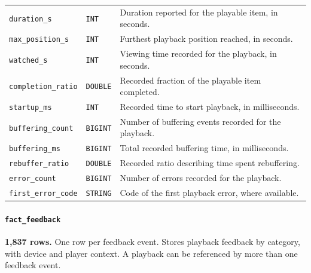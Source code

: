 \documentclass[a4paper,12pt]{article}
\newcommand{\dbsep}{\_\allowbreak}
\begin{document}
\begin{longtable}{@{}>{\raggedright\arraybackslash}p{}
                    >{\raggedright\arraybackslash}p{}
                    >{\raggedright\arraybackslash}p{}@{}}
\texttt{duration\dbsep s} & \texttt{INT} & Duration reported for the playable item, in seconds.\\
\texttt{max\dbsep position\dbsep s} & \texttt{INT} & Furthest playback position reached, in seconds.\\
\texttt{watched\dbsep s} & \texttt{INT} & Viewing time recorded for the playback, in seconds.\\
\texttt{completion\dbsep ratio} & \texttt{DOUBLE} & Recorded fraction of the playable item completed.\\
\texttt{startup\dbsep ms} & \texttt{INT} & Recorded time to start playback, in milliseconds.\\
\texttt{buffering\dbsep count} & \texttt{BIGINT} & Number of buffering events recorded for the playback.\\
\texttt{buffering\dbsep ms} & \texttt{BIGINT} & Total recorded buffering time, in milliseconds.\\
\texttt{rebuffer\dbsep ratio} & \texttt{DOUBLE} & Recorded ratio describing time spent rebuffering.\\
\texttt{error\dbsep count} & \texttt{BIGINT} & Number of errors recorded for the playback.\\
\texttt{first\dbsep error\dbsep code} & \texttt{STRING} & Code of the first playback error, where available.\\
\end{longtable}
\endgroup

\paragraph{\texttt{fact\dbsep feedback}}
\textbf{1,837 rows.} One row per feedback event.
Stores playback feedback by category, with device and player context. A playback can be referenced by more than one feedback event.
\end{document}
